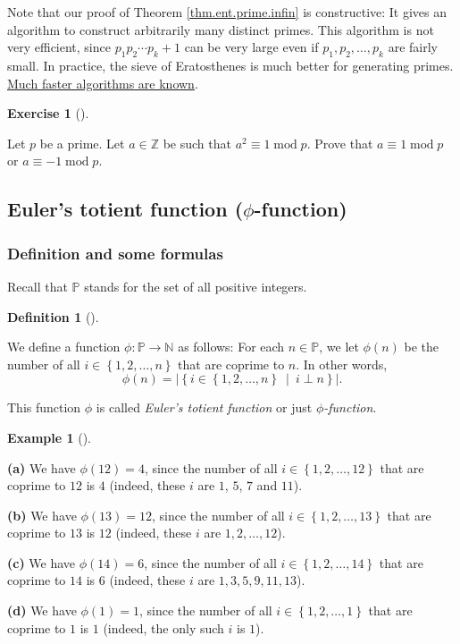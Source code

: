 \documentclass[numbers=enddot,12pt,final,onecolumn,notitlepage]{scrartcl}%
\newcounter{exer}
\numberwithin{exer}{subsection}
\theoremstyle{definition}
\newtheorem{defi}[theo]{Definition}
\newenvironment{definition}[1][]
{\begin{defi}[#1]\begin{leftbar}}
{\end{leftbar}\end{defi}}
\newtheorem{exam}[theo]{Example}
\newenvironment{example}[1][]
{\begin{exam}[#1]\begin{leftbar}}
{\end{leftbar}\end{exam}}
\newtheorem{exmp}[exer]{Exercise}
\newenvironment{exercise}[1][]
{\begin{exmp}[#1]\begin{leftbar}}
{\end{leftbar}\end{exmp}}
\begin{document}
Note that our proof of Theorem \ref{thm.ent.prime.infin} is constructive: It
gives an algorithm to construct arbitrarily many distinct primes. This
algorithm is not very efficient, since $p_{1}p_{2}\cdots p_{k}+1$ can be very
large even if $p_{1},p_{2},\ldots,p_{k}$ are fairly small. In practice, the
sieve of Eratosthenes is much better for generating primes.
\href{https://en.wikipedia.org/wiki/Generating_primes}{Much faster algorithms
are known}.

\begin{exercise}
\label{exe.ent.prime.aa-1}Let $p$ be a prime. Let $a\in\mathbb{Z}$ be such
that $a^{2}\equiv1\operatorname{mod}p$. Prove that $a\equiv1\operatorname{mod}%
p$ or $a\equiv-1\operatorname{mod}p$.
\end{exercise}

\subsection{Euler's totient function ($\phi$-function)}

\subsubsection{Definition and some formulas}

Recall that $\mathbb{P}$ stands for the set of all positive integers.

\begin{definition}
\label{def.ent.phi.phi}We define a function $\phi:\mathbb{P}\rightarrow
\mathbb{N}$ as follows: For each $n\in\mathbb{P}$, we let $\phi\left(
n\right)  $ be the number of all $i\in\left\{  1,2,\ldots,n\right\}  $ that
are coprime to $n$. In other words,%
\begin{equation}
\phi\left(  n\right)  =\left\vert \left\{  i\in\left\{  1,2,\ldots,n\right\}
\ \mid\ i\perp n\right\}  \right\vert . \label{eq.def.ent.phi.phi.1}%
\end{equation}


This function $\phi$ is called \textit{Euler's totient function} or just
$\phi$\textit{-function}.
\end{definition}

\begin{example}
\textbf{(a)} We have $\phi\left(  12\right)  =4$, since the number of all
$i\in\left\{  1,2,\ldots,12\right\}  $ that are coprime to $12$ is $4$
(indeed, these $i$ are $1$, $5$, $7$ and $11$).

\textbf{(b)} We have $\phi\left(  13\right)  =12$, since the number of all
$i\in\left\{  1,2,\ldots,13\right\}  $ that are coprime to $13$ is $12$
(indeed, these $i$ are $1,2,\ldots,12$).

\textbf{(c)} We have $\phi\left(  14\right)  =6$, since the number of all
$i\in\left\{  1,2,\ldots,14\right\}  $ that are coprime to $14$ is $6$
(indeed, these $i$ are $1,3,5,9,11,13$).

\textbf{(d)} We have $\phi\left(  1\right)  =1$, since the number of all
$i\in\left\{  1,2,\ldots,1\right\}  $ that are coprime to $1$ is $1$ (indeed,
the only such $i$ is $1$).
\end{example}
\end{document}
